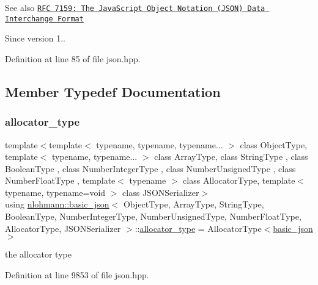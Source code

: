 \begin{DoxySeeAlso}{See also}
\href{http://rfc7159.net/rfc7159}{\tt R\+FC 7159\+: The Java\+Script Object Notation (J\+S\+ON) Data Interchange Format}
\end{DoxySeeAlso}
\begin{DoxySince}{Since}
version 1.. 
\end{DoxySince}


Definition at line 85 of file json.\+hpp.



\subsection{Member Typedef Documentation}
\mbox{\label{classnlohmann_1_1basic__json_a86ce930490cf7773b26f5ef49c04a350}} 
\subsubsection{\texorpdfstring{allocator\+\_\+type}{allocator\_type}}
{\footnotesize\ttfamily template$<$template$<$ typename, typename, typename... $>$ class Object\+Type, template$<$ typename, typename... $>$ class Array\+Type, class String\+Type , class Boolean\+Type , class Number\+Integer\+Type , class Number\+Unsigned\+Type , class Number\+Float\+Type , template$<$ typename $>$ class Allocator\+Type, template$<$ typename, typename=void $>$ class J\+S\+O\+N\+Serializer$>$ \\
using \hyperlink{classnlohmann_1_1basic__json}{nlohmann\+::basic\+\_\+json}$<$ Object\+Type, Array\+Type, String\+Type, Boolean\+Type, Number\+Integer\+Type, Number\+Unsigned\+Type, Number\+Float\+Type, Allocator\+Type, J\+S\+O\+N\+Serializer $>$\+::\hyperlink{classnlohmann_1_1basic__json_a86ce930490cf7773b26f5ef49c04a350}{allocator\+\_\+type} =  Allocator\+Type$<$\hyperlink{classnlohmann_1_1basic__json}{basic\+\_\+json}$>$}



the allocator type 



Definition at line 9853 of file json.\+hpp.

\mbox{\label{classnlohmann_1_1basic__json_ae095578e03df97c5b3991787f1056374}} 
